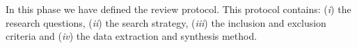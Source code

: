 In this phase we have defined the review protocol. This protocol contains: (\textit{i}) the research questions, (\textit{ii}) the search strategy, (\textit{iii}) the inclusion and exclusion criteria and (\textit{iv}) the data extraction and synthesis method.







